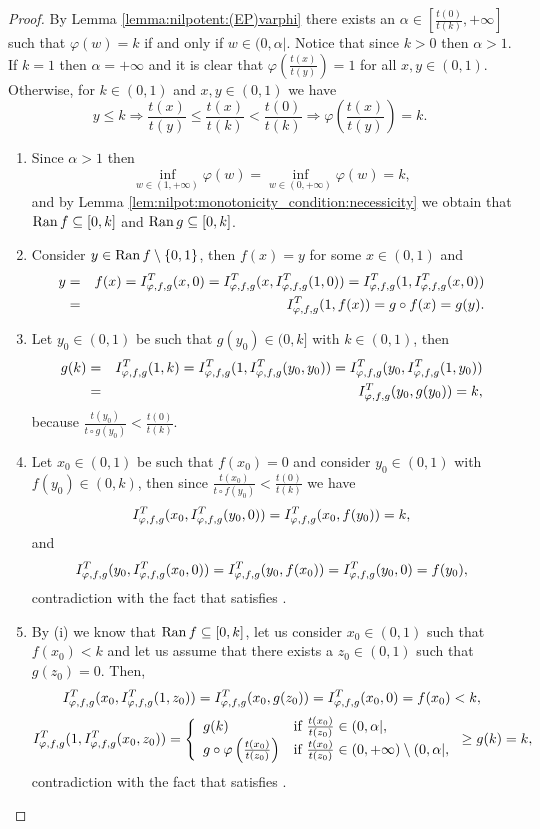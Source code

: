 \begin{proof}
	By Lemma \ref{lemma:nilpotent:(EP)varphi} there exists an $\alpha \in \left[ \frac{t(0)}{t(k)},+\infty \right]$ such that $\varphi(w)=k$ if and only if $w \in (0,\alpha|$. Notice that since $k>0$ then $\alpha>1$. If $k=1$ then $\alpha=+\infty$ and it is clear that $\varphi \left(\frac{t(x)}{t(y)}\right)=1$ for all $x,y \in (0,1)$. Otherwise, for $k \in (0,1)$ and $x,y \in (0,1)$ we have
	$$y \leq k \Rightarrow \frac{t(x)}{t(y)} \leq \frac{t(x)}{t(k)} < \frac{t(0)}{t(k)} \Rightarrow \varphi \left(\frac{t(x)}{t(y)}\right)=k.$$
	
	\begin{enumerate}[label=(\roman*)]
		\item Since $\alpha > 1$ then
		$$\inf_{w \in (1,+\infty)} \varphi(w) = \inf_{w \in (0,+\infty)} \varphi(w) =k,$$
		and by Lemma \ref{lem:nilpot:monotonicity_condition:necessicity} we obtain that $\operatorname{Ran} f \subseteq [0,k]$ and $\operatorname{Ran} g \subseteq [0,k]$.
		\item Consider $y \in \operatorname{Ran} f \setminus \{0,1\}$, then $f(x)=y$ for some $x \in (0,1)$ and
		\begin{eqnarray*}
		y &=& f(x)=I^T_{\varphi,f,g}(x,0)=I^T_{\varphi,f,g}(x,I^T_{\varphi,f,g}(1,0)) = I^T_{\varphi,f,g}(1,I^T_{\varphi,f,g}(x,0)) \\
		&=&I^T_{\varphi,f,g}(1,f(x))=g \circ f(x)=g(y).
		\end{eqnarray*}
		\item  Let $y_0 \in (0,1)$ be such that $g(y_0) \in (0,k]$ with $k \in (0,1)$, then
		\begin{eqnarray*}
		g(k) &=& I^T_{\varphi,f,g}(1,k)=I^T_{\varphi,f,g}(1,I^T_{\varphi,f,g}(y_0,y_0)) = I^T_{\varphi,f,g}(y_0,I^T_{\varphi,f,g}(1,y_0))\\
		&=&I^T_{\varphi,f,g}(y_0,g(y_0))=k,
		\end{eqnarray*}
		because $\frac{t(y_0)}{t \circ g (y_0)} < \frac{t(0)}{t(k)}$.
		\item Let $x_0 \in (0,1)$ be such that $f(x_0)=0$ and consider $y_0 \in (0,1)$ with $f(y_0) \in (0,k)$, then since $\frac{t(x_0)}{t \circ f (y_0)} < \frac{t(0)}{t(k)}$ we have
		$$I^T_{\varphi,f,g}(x_0,I^T_{\varphi,f,g}(y_0,0))=I^T_{\varphi,f,g}(x_0,f(y_0))=k,$$
		and
		$$I^T_{\varphi,f,g}(y_0,I^T_{\varphi,f,g}(x_0,0)) = I^T_{\varphi,f,g}(y_0,f(x_0)) = I^T_{\varphi,f,g}(y_0,0)=f(y_0),$$
		contradiction with the fact that \IT satisfies \EP.
		\item By (i) we know that $\operatorname{Ran} f \subseteq [0,k]$, let us consider $x_0 \in (0,1)$ such that $f(x_0)<k$ and let us assume that there exists a $z_0 \in (0,1)$ such that $g(z_0) = 0$. Then,
		$$I^T_{\varphi,f,g}(x_0,I^T_{\varphi,f,g}(1,z_0)) = I^T_{\varphi,f,g}(x_0,g(z_0)) = I^T_{\varphi,f,g}(x_0,0)=f(x_0)<k,$$
		$$I^T_{\varphi,f,g}(1,I^T_{\varphi,f,g}(x_0,z_0))
		=
		\left\{ \begin{array}{ll}
			g(k) &  \text{if }  \frac{t(x_0)}{t(z_0)} \in (0,\alpha|, \\
			g \circ \varphi \left(\frac{t(x_0)}{t(z_0)}\right) & \text{if }  \frac{t(x_0)}{t(z_0)} \in (0,+\infty) \setminus (0,\alpha|,
		\end{array}
		\right.
		\geq g(k)=k,
		$$
		contradiction with the fact that \IT satisfies \EP.
	\end{enumerate}
\end{proof}

